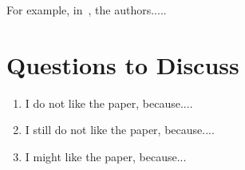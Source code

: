 \documentclass[sigplan,screen]{acmart}
\begin{document}
For example, in~\cite{tkfuzz}, the authors.....

\section{Questions to Discuss}

\begin{enumerate}
	\item I do not like the paper, because....
	\item I still do not like the paper, because....
    \item I might like the paper, because...
\end{enumerate}



\end{document}
